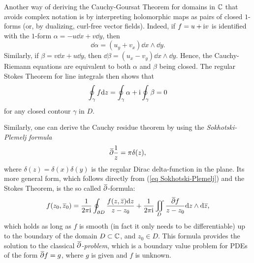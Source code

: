 \begin{rem}
    Another way of deriving the Cauchy-Goursat Theorem for domains in $\mathbb{C}$ that avoids complex notation is by interpreting holomorphic maps as pairs of closed $1$-forms (or, by dualizing, curl-free vector fields). Indeed, if $f=u+\mathrm{i} v$ is identified with the $1$-form $\alpha=-u\dd x+v\dd y$, then 
    \[\dd\alpha=(u_y+v_x)\dd x\wedge\dd y.\]
    Similarly, if $\beta=v\dd x+u\dd y$, then $\dd \beta=(u_x-v_y)\dd x\wedge\dd y$. Hence, the Cauchy-Riemann equations are equivalent to both $\alpha$ and $\beta$ being closed. The regular Stokes Theorem for line integrals then shows that 
    \[\oint_\gamma f{\mathrm{d}} z=\oint_\gamma\alpha+\mathrm{i} \oint_\gamma \beta=0\] for any closed contour $\gamma$ in $D$.
\end{rem}

\begin{rem}
    Similarly, one can derive the Cauchy residue theorem by using the \emph{Sokhotski-Plemelj formula} 
    \[\wb\partial \frac{1}{z}=\pi \delta(z),\label{eq Sokhotski-Plemelj}\] where $\delta(z)=\delta(x)\delta(y)$ is the regular Dirac delta-function in the plane. Its more general form, which follows directly from (\ref{eq Sokhotski-Plemelj}) and the Stokes Theorem, is the so called $\wb\partial$-formula:
    \[f(z_0,\wb{z}_0)=\frac{1}{2\pi \i}\oint_{\partial D}\frac{f(z,\wb{z})\dd z}{z-z_0}+\frac{1}{2\pi\i}\iint_D \frac{\wb\partial f}{z-z_0}\dd z\wedge\dd\wb{z},\label{eq dbar formula}\]
    which holds as long as $f$ is smooth (in fact it only needs to be differentiable) up to the boundary of the domain $D\subset\mathbb{C}$, and $z_0\in D$.
    This formula provides the solution to the classical \emph{$\wb\partial$-problem}, which is a boundary value problem for PDEs of the form $\wb\partial f=g$, where $g$ is given and $f$ is unknown.
\end{rem}

